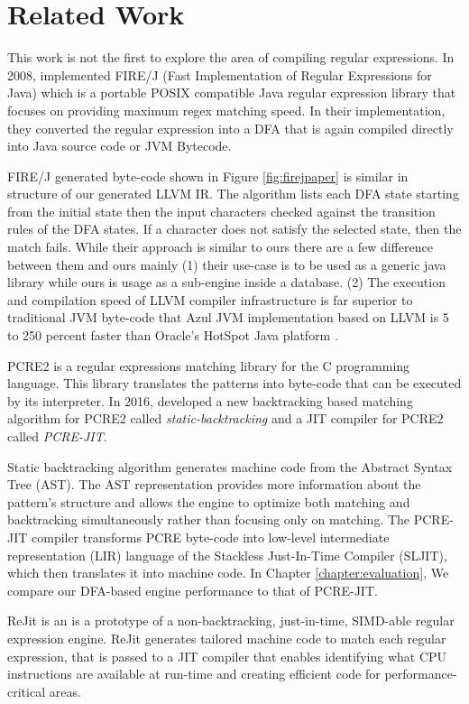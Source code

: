\chapter{Related Work}\label{chapter:related_work}
This work is not the first to explore the area of compiling regular expressions. In 2008, \citet{firejpaper} implemented FIRE/J (Fast Implementation of Regular Expressions for Java) which is a portable POSIX compatible Java regular expression library that focuses on providing maximum regex matching speed. In their implementation, they converted the regular expression into a DFA that is again compiled directly into Java source code or JVM Bytecode.

\noindent FIRE/J generated byte-code shown in Figure \ref{fig:firejpaper} is similar in structure of our generated LLVM IR. The algorithm lists each DFA state starting from the initial state then the input characters checked against the transition rules of the DFA states. If a character does not satisfy the selected state, then the match fails. While their approach is similar to ours there are a few difference between them and ours mainly (1) their use-case is to be used as a generic java library while ours is usage as a sub-engine inside a database. (2) The execution and compilation speed of LLVM compiler infrastructure is far superior to traditional JVM byte-code that Azul JVM implementation based on LLVM is 5 to 250 percent faster than Oracle's HotSpot Java platform \cite{azul}.

PCRE2 is a regular expressions matching library for the C programming language. This library translates the patterns into byte-code that can be executed by its interpreter.  In 2016, \citet{pcre2_jit} developed a new backtracking based matching algorithm for PCRE2 called \textit{static-backtracking} and a JIT compiler for PCRE2 called \textit{PCRE-JIT}.

Static backtracking algorithm generates machine code from the Abstract Syntax Tree (AST). The AST representation provides more information about the pattern's structure and allows the engine to optimize both matching and backtracking simultaneously rather than focusing only on matching. The PCRE-JIT compiler transforms PCRE byte-code into low-level intermediate representation (LIR) language of the Stackless Just-In-Time Compiler (SLJIT), which then translates it into machine code. In Chapter \ref{chapter:evaluation}, We compare our DFA-based engine performance to that of PCRE-JIT.

ReJit \cite{rejit} is an is a prototype of a non-backtracking, just-in-time, SIMD-able regular expression engine. ReJit generates tailored machine code to match each regular expression, that is passed to a JIT compiler that enables identifying what CPU instructions are available at run-time and creating efficient code for performance-critical areas.

